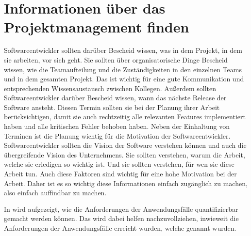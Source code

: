 \section{Informationen über das Projektmanagement finden}
Softwareentwickler sollten darüber Bescheid wissen, was in dem Projekt, in dem sie arbeiten, vor sich geht.
Sie sollten über organisatorische Dinge Bescheid wissen, wie die Teamaufteilung und die Zuständigkeiten in den einzelnen Teams und in dem gesamten Projekt.
Das ist wichtig für eine gute Kommunikation und entsprechenden Wissensaustausch zwischen Kollegen.
Außerdem sollten Softwareentwickler darüber Bescheid wissen, wann das nächste Release der Software ansteht.
Diesen Termin sollten sie bei der Planung ihrer Arbeit berücksichtigen, damit sie auch rechtzeitig alle relevanten Features implementiert haben und alle kritischen Fehler behoben haben.
Neben der Einhaltung von Terminen ist die Planung wichtig für die Motivation der Softwareentwickler.
Softwareentwickler sollten die Vision der Software verstehen können und auch die übergreifende Vision des Unternehmens.
Sie sollten verstehen, warum die Arbeit, welche sie erledigen so wichtig ist.
Und sie sollten verstehen, für wen sie diese Arbeit tun.
Auch diese Faktoren sind wichtig für eine hohe Motivation bei der Arbeit.
Daher ist es so wichtig diese Informationen einfach zugänglich zu machen, also einfach auffindbar zu machen.

In  wird aufgezeigt, wie die Anforderungen der Anwendungsfälle quantifizierbar gemacht werden können.
Das wird dabei helfen nachzuvollziehen, inwieweit die Anforderungen der Anwendungsfälle erreicht wurden, welche genannt wurden.
